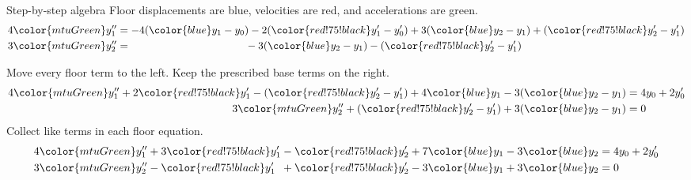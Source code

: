 \documentclass[11pt,aspectratio=169]{beamer}
\begin{document}
\begin{frame}{Step-by-step algebra}
\setlength{\abovedisplayskip}{5pt}
\setlength{\belowdisplayskip}{5pt}
\setlength{\abovedisplayshortskip}{5pt}
\setlength{\belowdisplayshortskip}{5pt}
Floor displacements are blue, velocities are red, and accelerations are green.
\[
  \begin{aligned}
    4{\color{mtuGreen}y_1''}
      &=-4({\color{blue}y_1}-y_0)-2({\color{red!75!black}y_1'}-y_0')
        +3({\color{blue}y_2-y_1})+({\color{red!75!black}y_2'-y_1'})\\
    3{\color{mtuGreen}y_2''}
      &=\phantom{-4(y_1-y_0)-2(y_1'-y_0')}
        -3({\color{blue}y_2-y_1})-({\color{red!75!black}y_2'-y_1'})
  \end{aligned}
\]

Move every floor term to the left. Keep the prescribed base terms on the right.
\[
  \begin{aligned}
    4{\color{mtuGreen}y_1''}
      +2{\color{red!75!black}y_1'}-({\color{red!75!black}y_2'-y_1'})
      +4{\color{blue}y_1}-3({\color{blue}y_2-y_1})
      &=4y_0+2y_0'\\
    3{\color{mtuGreen}y_2''}
      +({\color{red!75!black}y_2'-y_1'})+3({\color{blue}y_2-y_1})
      &=0
  \end{aligned}
\]
Collect like terms in each floor equation.
\[
  \begin{alignedat}{5}
    4{\color{mtuGreen}y_1''}
      &{}+3{\color{red!75!black}y_1'} &&{}-{\color{red!75!black}y_2'}
      &&{}+7{\color{blue}y_1} &&{}-3{\color{blue}y_2}
      &&=4y_0+2y_0'\\
    3{\color{mtuGreen}y_2''}
      &{}-{\color{red!75!black}y_1'} &&{}+{\color{red!75!black}y_2'}
      &&{}-3{\color{blue}y_1} &&{}+3{\color{blue}y_2}
      &&=0
  \end{alignedat}
\]
\end{frame}
\end{document}

